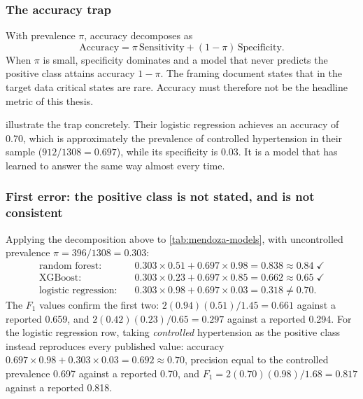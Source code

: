 \documentclass[12pt,a4paper,oneside]{report}
\begin{document}
\subsubsection{The accuracy trap}\label{sec:accuracy-trap}

With prevalence $\pi$, accuracy decomposes as
\begin{equation}
  \text{Accuracy} = \pi\,\text{Sensitivity} + (1-\pi)\,\text{Specificity}.
\end{equation}
When $\pi$ is small, specificity dominates and a model that never predicts the positive class attains accuracy $1-\pi$. The framing document states that in the target data critical states are rare. Accuracy must therefore not be the headline metric of this thesis.

\Textcite{mendoza2025} illustrate the trap concretely. Their logistic regression achieves an accuracy of 0.70, which is approximately the prevalence of controlled hypertension in their sample ($912/1308 = 0.697$), while its specificity is 0.03. It is a model that has learned to answer the same way almost every time.

\subsubsection{First error: the positive class is not stated, and is not consistent}\label{sec:positive-class}

Applying the decomposition above to \cref{tab:mendoza-models}, with uncontrolled prevalence $\pi = 396/1308 = 0.303$:
\begin{align}
  \text{random forest:}\quad & 0.303 \times 0.51 + 0.697 \times 0.98 = 0.838 \approx 0.84 \;\checkmark\\
  \text{XGBoost:}\quad & 0.303 \times 0.23 + 0.697 \times 0.85 = 0.662 \approx 0.65 \;\checkmark\\
  \text{logistic regression:}\quad & 0.303 \times 0.98 + 0.697 \times 0.03 = 0.318 \neq 0.70.
\end{align}
The $F_1$ values confirm the first two: $2(0.94)(0.51)/1.45 = 0.661$ against a reported 0.659, and $2(0.42)(0.23)/0.65 = 0.297$ against a reported 0.294. For the logistic regression row, taking \emph{controlled} hypertension as the positive class instead reproduces every published value: accuracy $0.697 \times 0.98 + 0.303 \times 0.03 = 0.692 \approx 0.70$, precision equal to the controlled prevalence 0.697 against a reported 0.70, and $F_1 = 2(0.70)(0.98)/1.68 = 0.817$ against a reported 0.818.
\end{document}
